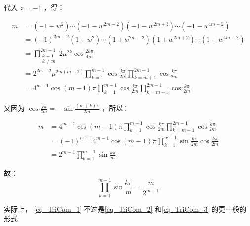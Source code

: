 代入 $z=-1$ ，得：

$$\begin{aligned} m&=(-1-w^2)\cdots(-1-w^{2m-2})(-1-w^{2m+2})\cdots(-1-w^{4m-2})\\ &=(-1)^{2m-2}(1+w^2)\cdots(1+w^{2m-2})(1+w^{2m+2})\cdots(1+w^{4m-2})\\ &=\prod_{\substack{k=1\\k\neq m}}^{2m-1}2\mu^{2k}\cos\frac{2k\pi}{4m}\\ &=2^{2m-2}\mu^{2m(m-2)}\prod_{k=1}^{m-1}\cos\frac{k\pi}{2m}\prod_{k=m+1}^{2m-1}\cos\frac{k\pi}{2m}\\ &=4^{m-1}\cos(m-1)\pi\prod_{k=1}^{m-1}\cos\frac{k\pi}{2m}\prod_{k=m+1}^{2m-1}\cos\frac{k\pi}{2m}  \end{aligned}$$

又因为 $\displaystyle{\cos\frac{k\pi}{2m}=-\sin\frac{(m+k)\pi}{2m}}$ ，所以：

$$\begin{aligned} m&=4^{m-1}\cos(m-1)\pi\prod_{k=1}^{m-1}\cos\frac{k\pi}{2m}\prod_{k=m+1}^{2m-1}\cos\frac{k\pi}{2m}\\ &=(-1)^{m-1}4^{m-1}\cos(m-1)\pi\prod_{k=1}^{m-1}\sin\frac{k\pi}{2m}\cos\frac{k\pi}{2m}\\ &=2^{m-1}\prod_{k=1}^{m-1}\sin\frac{k\pi}{m} \end{aligned}$$

故：
\begin{equation}\label{eq_TriCom_1}%
\prod_{k=1}^{m-1}\sin\frac{k\pi}{m}=\frac{m}{2^{m-1}}
\end{equation}

实际上， \autoref{eq_TriCom_1}  不过是\autoref{eq_TriCom_2}  和\autoref{eq_TriCom_3} 的更一般的形式
